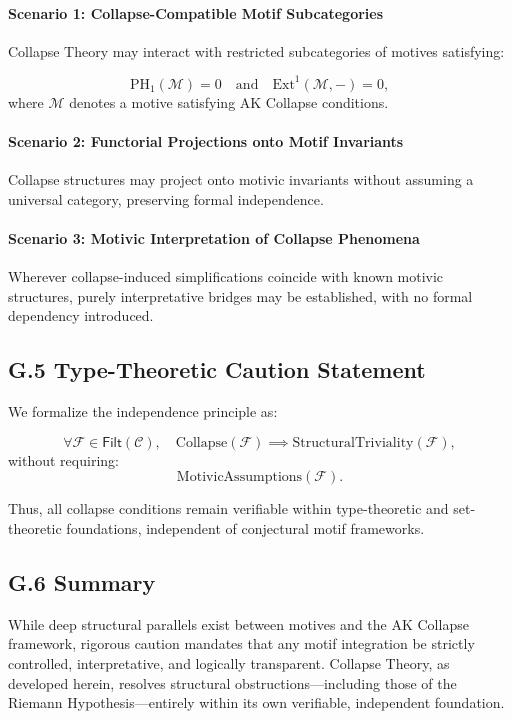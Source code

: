 \documentclass[11pt]{article}
\begin{document}
\paragraph{Scenario 1: Collapse-Compatible Motif Subcategories}  
Collapse Theory may interact with restricted subcategories of motives satisfying:

\[
\mathrm{PH}_1(\mathcal{M}) = 0 \quad \text{and} \quad \mathrm{Ext}^1(\mathcal{M}, -) = 0,
\]
where $\mathcal{M}$ denotes a motive satisfying AK Collapse conditions.

\paragraph{Scenario 2: Functorial Projections onto Motif Invariants}  
Collapse structures may project onto motivic invariants without assuming a universal category, preserving formal independence.

\paragraph{Scenario 3: Motivic Interpretation of Collapse Phenomena}  
Wherever collapse-induced simplifications coincide with known motivic structures, purely interpretative bridges may be established, with no formal dependency introduced.

\subsection*{G.5 Type-Theoretic Caution Statement}

We formalize the independence principle as:

\[
\forall \mathcal{F} \in \mathsf{Filt}(\mathcal{C}), \quad 
\mathrm{Collapse}(\mathcal{F}) \implies \mathrm{StructuralTriviality}(\mathcal{F}),
\]
without requiring:
\[
\mathrm{MotivicAssumptions}(\mathcal{F}).
\]

Thus, all collapse conditions remain verifiable within type-theoretic and set-theoretic foundations, independent of conjectural motif frameworks.

\subsection*{G.6 Summary}

While deep structural parallels exist between motives and the AK Collapse framework, rigorous caution mandates that any motif integration be strictly controlled, interpretative, and logically transparent. Collapse Theory, as developed herein, resolves structural obstructions—including those of the Riemann Hypothesis—entirely within its own verifiable, independent foundation.
\end{document}
